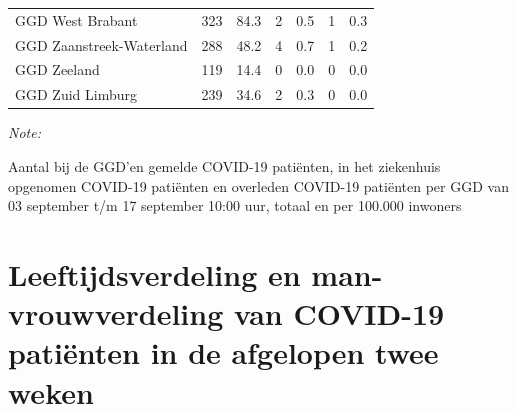 \documentclass[
  english,
  man,floatsintext]{apa6}
\begin{document}
\begin{table}[H]
\begin{threeparttable}
\begin{tabular}{lrrrrrr}
GGD West Brabant & 323 & 84.3 & 2 & 0.5 & 1 & 0.3\\
GGD Zaanstreek-Waterland & 288 & 48.2 & 4 & 0.7 & 1 & 0.2\\
GGD Zeeland & 119 & 14.4 & 0 & 0.0 & 0 & 0.0\\
GGD Zuid Limburg & 239 & 34.6 & 2 & 0.3 & 0 & 0.0\\
\bottomrule
\end{tabular}
\begin{tablenotes}
\item \textit{Note: } 
\item Aantal bij de GGD’en gemelde COVID-19 patiënten, in het ziekenhuis opgenomen COVID-19 patiënten en overleden COVID-19 patiënten per GGD van 03 september t/m 17 september 10:00 uur, totaal en per 100.000 inwoners
\end{tablenotes}
\end{threeparttable}
\endgroup{}
\end{table}

\newpage

\hypertarget{leeftijdsverdeling-en-man-vrouwverdeling-van-covid-19-patiuxebnten-in-de-afgelopen-twee-weken}{%
\section{Leeftijdsverdeling en man-vrouwverdeling van COVID-19 patiënten in de afgelopen twee weken}\label{leeftijdsverdeling-en-man-vrouwverdeling-van-covid-19-patiuxebnten-in-de-afgelopen-twee-weken}}
\end{document}
